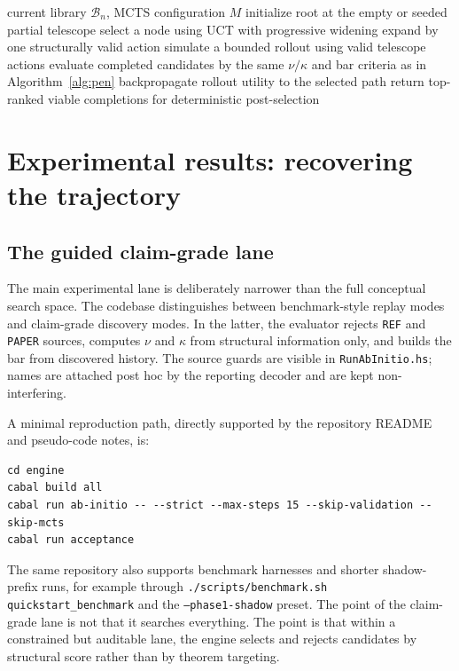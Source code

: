 \documentclass[pdflatex,sn-mathphys,Numbered]{sn-jnl}
\theoremstyle{thmstyleone}
\theoremstyle{thmstylethree}
\theoremstyle{thmstyletwo}
\newcommand{\Bcal}{\mathcal{B}}
\begin{document}
\begin{algorithm}[t]
\caption{MCTS fallback over partial telescopes}
\label{alg:mcts}
\begin{algorithmic}[1]
\Require current library $\Bcal_n$, MCTS configuration $M$
\State initialize root at the empty or seeded partial telescope
  \State select a node using UCT with progressive widening
  \State expand by one structurally valid action
  \State simulate a bounded rollout using valid telescope actions
  \State evaluate completed candidates by the same $\nu/\kappa$ and bar criteria as in Algorithm~\ref{alg:pen}
  \State backpropagate rollout utility to the selected path
\EndFor
\State return top-ranked viable completions for deterministic post-selection
\end{algorithmic}
\end{algorithm}

\section{Experimental results: recovering the trajectory}\label{sec:results}

\subsection{The guided claim-grade lane}

The main experimental lane is deliberately narrower than the full conceptual search space. The codebase distinguishes between benchmark-style replay modes and claim-grade discovery modes. In the latter, the evaluator rejects \texttt{REF} and \texttt{PAPER} sources, computes $\nu$ and $\kappa$ from structural information only, and builds the bar from discovered history. The source guards are visible in \texttt{RunAbInitio.hs}; names are attached post hoc by the reporting decoder and are kept non-interfering.

A minimal reproduction path, directly supported by the repository README and pseudo-code notes, is:

\begin{lstlisting}
cd engine
cabal build all
cabal run ab-initio -- --strict --max-steps 15 --skip-validation --skip-mcts
cabal run acceptance
\end{lstlisting}

The same repository also supports benchmark harnesses and shorter shadow-prefix runs, for example through \texttt{./scripts/benchmark.sh quickstart\_benchmark} and the \texttt{--phase1-shadow} preset. The point of the claim-grade lane is not that it searches everything. The point is that within a constrained but auditable lane, the engine selects and rejects candidates by structural score rather than by theorem targeting.
\end{document}
